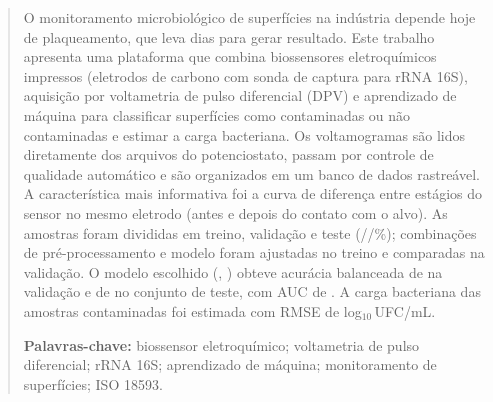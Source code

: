 \begin{abstract}
O monitoramento microbiológico de superfícies na indústria depende hoje de plaqueamento, que leva
dias para gerar resultado. Este trabalho apresenta uma plataforma que combina biossensores
eletroquímicos impressos (eletrodos de carbono com sonda de captura para rRNA 16S), aquisição por
voltametria de pulso diferencial (DPV) e aprendizado de máquina para classificar superfícies como
contaminadas ou não contaminadas e estimar a carga bacteriana. Os voltamogramas são lidos
diretamente dos arquivos do potenciostato, passam por controle de qualidade automático e são
organizados em um banco de dados rastreável. A característica mais informativa foi a curva de
diferença entre estágios do sensor no mesmo eletrodo (antes e depois do contato com o alvo).
As amostras foram divididas em treino, validação e teste (\PropTreino/\PropValidacao/\PropTeste\%);
\NCombinacoes{} combinações de pré-processamento e modelo foram ajustadas no treino e comparadas na
validação. O modelo escolhido (\MelhorModelo, \MelhorVariante) obteve acurácia balanceada de
\ABval{} na validação e de \ABteste{} no conjunto de teste, com AUC de \AUCteste. A carga bacteriana das amostras contaminadas foi estimada com
RMSE de \RegRMSEteste{} log$_{10}$\,UFC/mL. 

\medskip\noindent\textbf{Palavras-chave:} biossensor eletroquímico; voltametria de pulso
diferencial; rRNA 16S; aprendizado de máquina; monitoramento de superfícies; ISO 18593.
\end{abstract}
